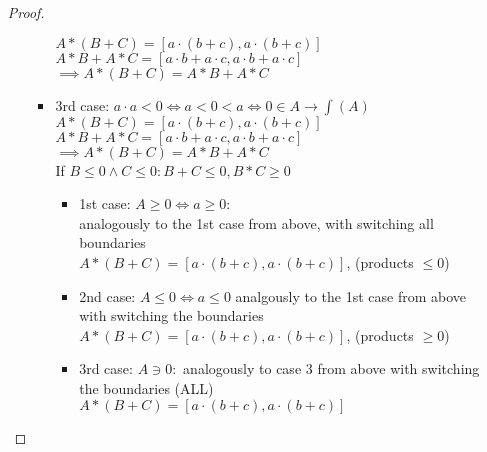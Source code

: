 \begin{itemize}
\begin{proof}
\begin{enumerate}
\begin{itemize}
			$A*(B+C)=[a\cdot(b+c),a\cdot(b+c)]$ \\
			$A*B+A*C=[a\cdot b+a\cdot c,a\cdot b+a\cdot c]$ \\
			$\implies A*(B+C)=A*B+A*C$
			\item 3rd case: $a\cdot a<0 \iff a<0<a \iff 0\in A \to \int(A)$ \\
			$A*(B+C)=[a\cdot(b+c),a\cdot(b+c)]$ \\
			$A*B+A*C=[a\cdot b+a\cdot c,a\cdot b+a\cdot c]$ \\
			$\implies A*(B+C)=A*B+A*C$ \\
			If $B\le 0 \land C\le 0: B+C\le 0, B*C\ge 0$
			\begin{itemize}
				\item 1st case: $A\ge 0 \iff a\ge 0$: \\
				analogously to the 1st case from above, with switching all boundaries \\
				$A*(B+C)=[a\cdot(b+c),a\cdot(b+c)]$, (products $\le 0$) 
				\item 2nd case: $A\le 0 \iff a\le 0$
				analgously to the 1st case from above with switching the boundaries
				$A*(B+C)=[a\cdot(b+c),a\cdot(b+c)]$, (products $\ge 0$)
				\item 3rd case: $A\ni 0:$ analogously to case 3 from above with switching the boundaries (ALL) \\
				$A*(B+C)=[a\cdot(b+c),a\cdot(b+c)]$
			\end{itemize}
		\end{itemize} 
	\end{enumerate}
\end{proof}


\end{itemize}
